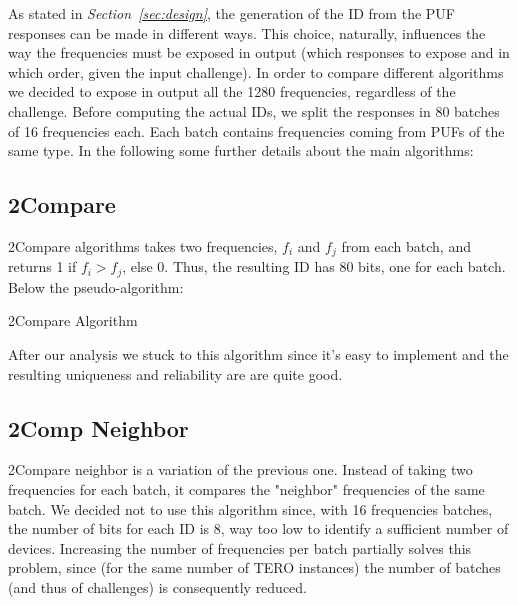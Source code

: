 %
%

As stated in \textit{Section~\ref{sec:design}}, the generation of the ID from the PUF responses can be made in different ways. This choice, naturally,
influences the way the frequencies must be exposed in output (which responses to expose and in which order, given the input challenge). In order to
compare different algorithms we decided to expose in output all the 1280 frequencies, regardless of the challenge. Before computing the actual IDs, we
split the responses in 80 batches of 16 frequencies each. Each batch contains frequencies coming from PUFs of the same type.
In the following some further details about the main algorithms:

\subsection{2Compare}
\label{subsec:2Comp}

2Compare algorithms takes two frequencies, $f_i$ and $f_j$ from each batch, and returns 1 if $f_i > f_j$, else $0$.
Thus, the resulting ID has 80 bits, one for each batch.\\

Below the pseudo-algorithm:

\begin{algorithm}[H]
    \label{alg:2comp}
    \caption{2Compare Algorithm}
    \label{alg:var1}
    \label{protocol11}
    \begin{algorithmic}[1]
    \ENDFOR
    \end{algorithmic}
    \end{algorithm} 

After our analysis we stuck to this algorithm since it's easy to implement and the resulting uniqueness and reliability are
are quite good.

\subsection{2Comp Neighbor}
\label{subsec:2Compneigh}

2Compare neighbor is a variation of the previous one. Instead of taking two frequencies for each batch, it compares the
"neighbor" frequencies of the same batch. We decided not to use this algorithm since, with 16 frequencies batches, the
number of bits for each ID is 8, way too low to identify a sufficient number of devices. Increasing the number of frequencies
per batch partially solves this problem, since (for the same number of TERO instances) the number of batches (and thus of challenges)
is consequently reduced.



